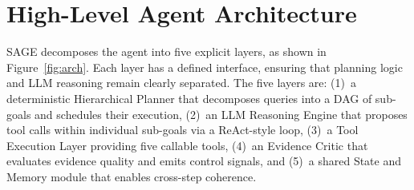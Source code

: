 \documentclass[11pt]{article}
\begin{document}
\section{High-Level Agent Architecture}

SAGE decomposes the agent into five explicit layers, as shown in Figure~\ref{fig:arch}.
Each layer has a defined interface, ensuring that planning logic and LLM reasoning remain
clearly separated. The five layers are: (1)~a deterministic Hierarchical Planner that decomposes queries into a DAG of sub-goals and schedules their execution, (2)~an LLM Reasoning Engine that proposes tool calls within individual sub-goals via a ReAct-style loop, (3)~a Tool Execution Layer providing five callable tools, (4)~an Evidence Critic that evaluates evidence quality and emits control signals, and (5)~a shared State and Memory module that enables cross-step coherence.
\end{document}
